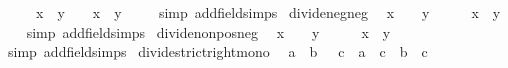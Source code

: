 \begin{isabellebody}
\ \ {\isachardoublequoteopen}{}\ {\isasymle}\ x\ {\isasymLongrightarrow}\ y\ {\isacharless}{\kern0pt}\ {}\ {\isasymLongrightarrow}\ x\ {\isacharslash}{\kern0pt}\ y\ {\isasymle}\ {}{\isachardoublequoteclose}\isanewline
%
\isadelimproof
\ \ %
\endisadelimproof
%
\isatagproof
{}\isamarkupfalse%
{\isacharparenleft}{\kern0pt}simp\ add{\isacharcolon}{\kern0pt}field{\isacharunderscore}{\kern0pt}simps{\isacharparenright}{\kern0pt}%
\endisatagproof
{\isafoldproof}%
%
\isadelimproof
\isanewline
%
\endisadelimproof
\isanewline
{}\isamarkupfalse%
\ divide{\isacharunderscore}{\kern0pt}neg{\isacharunderscore}{\kern0pt}neg{\isacharcolon}{\kern0pt}\isanewline
\ \ {\isachardoublequoteopen}x\ {\isacharless}{\kern0pt}\ {}\ {\isasymLongrightarrow}\ y\ {\isacharless}{\kern0pt}\ {}\ {\isasymLongrightarrow}\ {}\ {\isacharless}{\kern0pt}\ x\ {\isacharslash}{\kern0pt}\ y{\isachardoublequoteclose}\isanewline
%
\isadelimproof
\ \ %
\endisadelimproof
%
\isatagproof
{}\isamarkupfalse%
{\isacharparenleft}{\kern0pt}simp\ add{\isacharcolon}{\kern0pt}field{\isacharunderscore}{\kern0pt}simps{\isacharparenright}{\kern0pt}%
\endisatagproof
{\isafoldproof}%
%
\isadelimproof
\isanewline
%
\endisadelimproof
\isanewline
{}\isamarkupfalse%
\ divide{\isacharunderscore}{\kern0pt}nonpos{\isacharunderscore}{\kern0pt}neg{\isacharcolon}{\kern0pt}\isanewline
\ \ {\isachardoublequoteopen}x\ {\isasymle}\ {}\ {\isasymLongrightarrow}\ y\ {\isacharless}{\kern0pt}\ {}\ {\isasymLongrightarrow}\ {}\ {\isasymle}\ x\ {\isacharslash}{\kern0pt}\ y{\isachardoublequoteclose}\isanewline
%
\isadelimproof
\ \ %
\endisadelimproof
%
\isatagproof
{}\isamarkupfalse%
{\isacharparenleft}{\kern0pt}simp\ add{\isacharcolon}{\kern0pt}field{\isacharunderscore}{\kern0pt}simps{\isacharparenright}{\kern0pt}%
\endisatagproof
{\isafoldproof}%
%
\isadelimproof
\isanewline
%
\endisadelimproof
\isanewline
{}\isamarkupfalse%
\ divide{\isacharunderscore}{\kern0pt}strict{\isacharunderscore}{\kern0pt}right{\isacharunderscore}{\kern0pt}mono{\isacharcolon}{\kern0pt}\isanewline
\ \ {\isachardoublequoteopen}{\isasymlbrakk}a\ {\isacharless}{\kern0pt}\ b{\isacharsemicolon}{\kern0pt}\ {}\ {\isacharless}{\kern0pt}\ c{\isasymrbrakk}\ {\isasymLongrightarrow}\ a\ {\isacharslash}{\kern0pt}\ c\ {\isacharless}{\kern0pt}\ b\ {\isacharslash}{\kern0pt}\ c{\isachardoublequoteclose}\isanewline
%
\isadelimproof
\ \ %
\endisadelimproof
%
\isatagproof
{}\isamarkupfalse%

\end{isabellebody}
